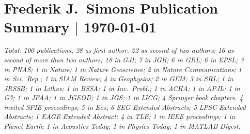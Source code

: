 \documentclass[12pt]{article}
\begin{document}
\section*{Frederik J.~Simons Publication Summary $|$ \today}

\emph{Total: 100 publications,
28 as first author,
22 as second of two authors;
16 as second of more than two authors;
18 in \emph{GJI};
7 in \emph{JGR};
6 in \emph{GRL};
6 in \emph{EPSL};
3 in \emph{PNAS};
1 in \emph{Nature};
1 in \emph{Nature Geoscience};
2 in \emph{Nature Communications};
1 in \emph{Sci.~Rep.};
1 in \emph{SIAM Review};
4 in \emph{Geophysics};
2 in \emph{GEM};
3 in \emph{SRL};
1 in \emph{JRSSB};
1 in \emph{Lithos};
1 in \emph{BSSA};
1 in \emph{Inv.~Probl.};
1 in \emph{ACHA};
1 in \emph{APJL};
1 in \emph{G3};
1 in \emph{JFAA};
1 in \emph{JGEOD};
1 in \emph{JGS};
1 in \emph{IJCG};
4 \emph{Springer} book chapters.
4 invited \emph{SPIE} proceedings;
5 in \emph{Eos};
6 \emph{SEG Extended Abstracts};
5 \emph{LPSC Extended Abstracts};
1 \emph{EAGE Extended Abstract};
4 in \emph{TLE};
1 in \emph{IEEE} proceedings;
1 in \emph{Planet Earth};
1 in \emph{Acoustics Today};
1 in \emph{Physics Today};
1 in \emph{MATLAB Digest}.}

\nocite{Bevis+2019,Dahlen+2008,Guillaumin+2022,Gualtieri+2020,Harig+2012,Harig+2015a,Kopp+2009,Nolet+2019,Pipatprathanporn+2022,Plattner+2014a,Plattner+2017a,Reuber+2020,Simon+2022,Simons+99,Simons+2003a,Simons+2006a,Simons+2006b,Simons+2009a,Simons+2011b,Simons+2013,Simons2010,Sukhovich+2015,Wang+2012a,Yuan+2014a,Yuan+2015}



\end{document}
